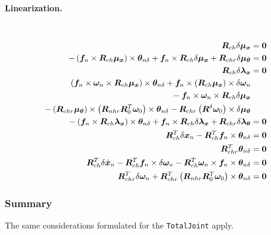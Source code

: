 \documentclass[10pt,dvips,fleqn,subeqn]{report}
\newcommand{\T}[1]{\bm{#1}}
\newcommand{\TT}[1]{\bm{#1}}
\begin{document}
\paragraph{Linearization.} \
\begin{subequations}
\begin{align}
	\TT{R}_{ch} \delta\T{\mu}_{\T{x}} &= \T{0} \\
%
	- \plbr{
		\T{f}_n \times \TT{R}_{ch} \T{\mu}_{\T{x}}
	} \times \T{\theta}_{n\delta}
	+ \T{f}_n \times \TT{R}_{ch} \delta\T{\mu}_{\T{x}} + \TT{R}_{chr} \delta\T{\mu}_{\T{\theta}} &= \T{0} \\
%
	\TT{R}_{ch} \delta\T{\lambda}_{\T{x}} &= \T{0} \\
%
	\plbr{
		\T{f}_n \times \T{\omega}_n \times \TT{R}_{ch} \T{\mu}_{\T{x}}
	} \times \T{\theta}_{n\delta} 
	+ \T{f}_n \times \plbr{\TT{R}_{ch} \T{\mu}_{\T{x}}} \times \delta\T{\omega}_n & \nonumber \\
	\mbox{} - \T{f}_n \times \T{\omega}_n \times \TT{R}_{ch} \delta\T{\mu}_{\T{x}} & \nonumber \\
	\mbox{} - \plbr{\TT{R}_{chr} \T{\mu}_{\T{\theta}}}
		\times \plbr{\TT{R}_{nhr} \TT{R}_0^T \T{\omega}_0} \times \T{\theta}_{n\delta} 
	- \TT{R}_{chr} \plbr{\TT{R}^{\delta} \T{\omega}_0} \times \delta\T{\mu}_{\T{\theta}} & \nonumber \\
	\mbox{} - \plbr{\T{f}_n \times \TT{R}_{ch} \T{\lambda}_{\T{x}}} \times \T{\theta}_{n\delta}
	+ \T{f}_n \times \TT{R}_{ch} \delta\T{\lambda}_{\T{x}} + \TT{R}_{chr} \delta\T{\lambda}_{\T{\theta}} &= \T{0} \\
%
	\TT{R}_{ch}^T \delta\T{x}_n - \TT{R}_{ch}^T\T{f}_n\times \T{\theta}_{n\delta} &= \T{0} \\
%
	\TT{R}_{chr}^T \T{\theta}_{n\delta} &= \T{0} \\
%
	\TT{R}_{ch}^T \delta\dot{\T{x}}_n
	- \TT{R}_{ch}^T \T{f}_n \times \delta\T{\omega}_n
	- \TT{R}_{ch}^T \T{\omega}_n \times \T{f}_n \times \T{\theta}_{n\delta} &= \T{0} \\
%
	\TT{R}_{chr}^T \delta\T{\omega}_n
	+ \TT{R}_{chr}^T \plbr{\TT{R}_{nhr} \TT{R}_0^T \T{\omega}_0} \times \T{\theta}_{n\delta} &= \T{0}
\end{align}
\end{subequations}



\subsubsection{Summary}
The same considerations formulated for the \texttt{TotalJoint} apply.
\end{document}
